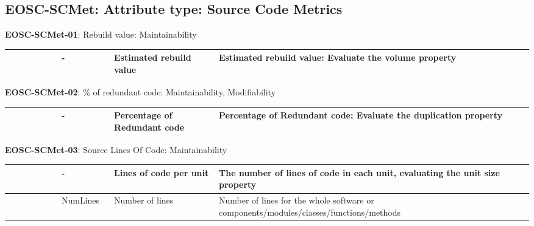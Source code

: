 \subsection{EOSC-SCMet: Attribute type: Source Code Metrics}

\textbf{EOSC-SCMet-01}: Rebuild value: Maintainability
\nopagebreak[4]
\begin{center}
    \tabletail{\hline}
    \tiny
    \begin{supertabular}{|p{0.10\linewidth}|p{0.10\linewidth}|p{0.20\linewidth}|p{0.60\linewidth}|} \hline
        \cite{srisopha_software_2018} & - & Estimated rebuild value & Estimated rebuild value: Evaluate the volume property\\ \hline
    \end{supertabular}
\end{center}

\textbf{EOSC-SCMet-02}: \% of redundant code: Maintainability, Modifiability
\nopagebreak[4]
\begin{center}
    \tabletail{\hline}
    \tiny
    \begin{supertabular}{|p{0.10\linewidth}|p{0.10\linewidth}|p{0.20\linewidth}|p{0.60\linewidth}|} \hline
        \cite{srisopha_software_2018} & - & Percentage of Redundant code & Percentage of Redundant code: Evaluate the duplication property\\ \hline
    \end{supertabular}
\end{center}

\textbf{EOSC-SCMet-03}: Source Lines Of Code: Maintainability
\nopagebreak[4]
\begin{center}
    \tabletail{\hline}
    \tiny
    \begin{supertabular}{|p{0.10\linewidth}|p{0.10\linewidth}|p{0.20\linewidth}|p{0.60\linewidth}|} \hline
        \cite{srisopha_software_2018} & - & Lines of code per unit & The number of lines of code in each unit, evaluating the unit size property\\ \hline
        \cite{montagud_systematic_2012} & NumLines & Number of lines & Number of lines for the whole software or components/modules/classes/functions/methods\\ \hline
    \end{supertabular}
\end{center}


